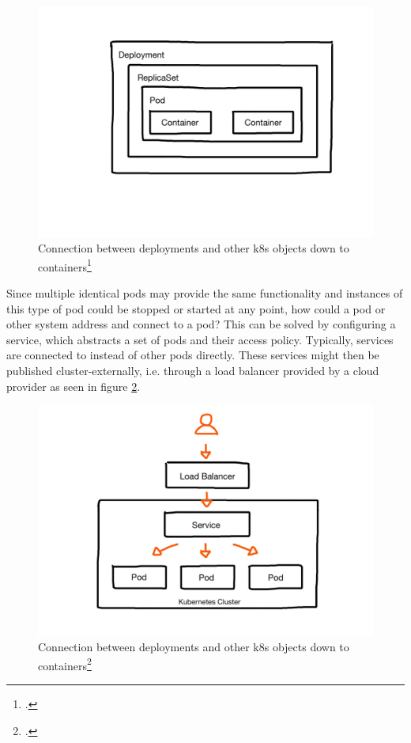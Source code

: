 \begin{figure}[H]
\centering
\includegraphics[scale=0.2]{pictures/deployment.JPG}
\caption{Connection between deployments and other \gls{k8s} objects down to containers\protect\footcite{nicoPictures}}
\label{fig:k8s-deployments}
\end{figure}

\newpage
Since multiple identical pods may provide the same functionality and instances of this type of pod could be stopped or started at any point, how could a pod or other system address and connect to a pod? This can be solved by configuring a service, which abstracts a set of pods and their access policy. Typically, services are connected to instead of other pods directly. These services might then be published cluster-externally, i.e. through a load balancer provided by a cloud provider as seen in figure \ref{fig:loadbalancer}.

\begin{figure}
\centering
\includegraphics[scale=0.2]{pictures/loadbalancer.JPG}
\caption{Connection between deployments and other \gls{k8s} objects down to containers\protect\footcite{nicoPictures}}
\label{fig:loadbalancer}
\end{figure}

